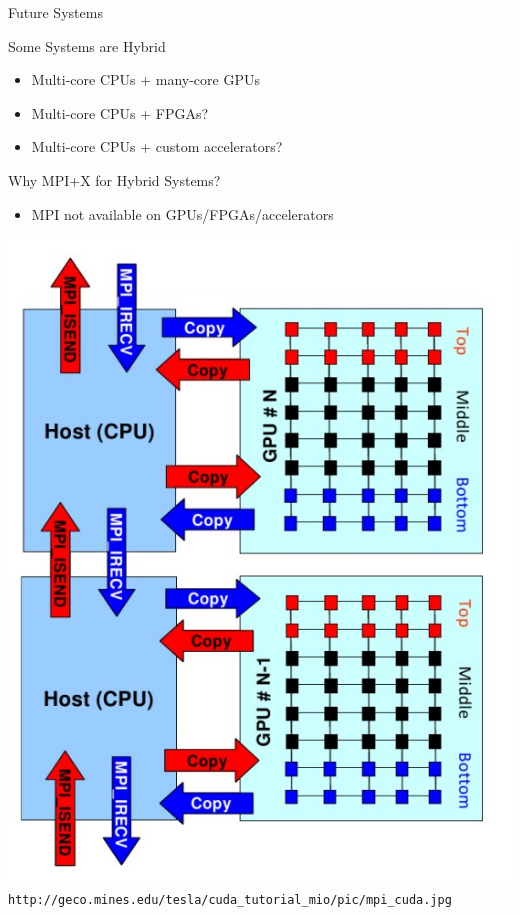\begin{frame}{Future Systems}

\begin{minipage}{0.6\textwidth}
 \begin{block}{Some Systems are Hybrid}
  \begin{itemize}
   \item Multi-core CPUs + many-core GPUs
   \item Multi-core CPUs + FPGAs?
   \item Multi-core CPUs + custom accelerators?
  \end{itemize}
 \end{block}

  \begin{block}{Why MPI+X for Hybrid Systems?}
  \begin{itemize}
   \item MPI not available on GPUs/FPGAs/accelerators
  \end{itemize}
 \end{block}
\end{minipage}
\begin{minipage}{0.39\textwidth}
 \includegraphics[width=1.0\textwidth]{figures/mpi_cuda} \\
 {\scriptsize \hspace*{-3.5cm} \texttt{http://geco.mines.edu/tesla/cuda\_tutorial\_mio/pic/mpi\_cuda.jpg} }
\end{minipage}


\end{frame}
